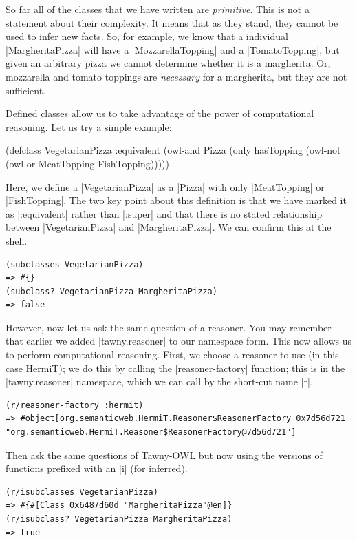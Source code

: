 So far all of the classes that we have written are
\emph{primitive}. This is not a statement about their complexity. It
means that as they stand, they cannot be used to infer new facts. So,
for example, we know that a individual |MargheritaPizza| will have a
|MozzarellaTopping| and a |TomatoTopping|, but given an arbitrary
pizza we cannot determine whether it is a margherita. Or, mozzarella
and tomato toppings are \emph{necessary} for a margherita, but they
are not sufficient.

Defined classes allow us to take advantage of the power of computational
reasoning. Let us try a simple example:

\begin{tawny}
(defclass VegetarianPizza
  :equivalent
  (owl-and Pizza
           (only hasTopping
                 (owl-not (owl-or MeatTopping FishTopping)))))
\end{tawny}

Here, we define a |VegetarianPizza| as a |Pizza| with only
|MeatTopping| or |FishTopping|. The two key point about this
definition is that we have marked it as |:equivalent| rather than |:super| and
that there is no stated relationship between |VegetarianPizza| and
|MargheritaPizza|. We can confirm this at the shell. 


\begin{verbatim}
(subclasses VegetarianPizza)
=> #{}
(subclass? VegetarianPizza MargheritaPizza)
=> false
\end{verbatim}

However, now let us ask the same question of a reasoner. You may
remember that earlier we added |tawny.reasoner| to our namespace
form. This now allows us to perform computational reasoning.  First,
we choose a reasoner to use (in this case HermiT); we do this by
calling the |reasoner-factory| function; this is in the
|tawny.reasoner| namespace, which we can call by the short-cut name |r|.

\begin{verbatim}
(r/reasoner-factory :hermit)
=> #object[org.semanticweb.HermiT.Reasoner$ReasonerFactory 0x7d56d721 "org.semanticweb.HermiT.Reasoner$ReasonerFactory@7d56d721"]
\end{verbatim}

Then ask the same questions of Tawny-OWL but now using the versions of
functions prefixed with an |i| (for inferred).

\begin{verbatim}
(r/isubclasses VegetarianPizza)
=> #{#[Class 0x6487d60d "MargheritaPizza"@en]}
(r/isubclass? VegetarianPizza MargheritaPizza)
=> true
\end{verbatim}

